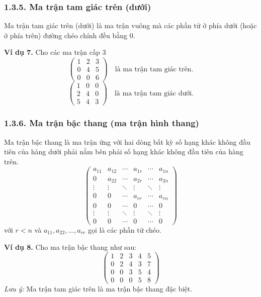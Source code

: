 \subsubsection*{1.3.5. Ma trận tam giác trên (dưới)}
Ma trận tam giác trên (dưới) là ma trận vuông mà các phần tử ở phía dưới (hoặc ở phía trên) đường chéo chính đều bằng 0.

\textbf{Ví dụ 7.} Cho các ma trận cấp 3
\[
\begin{pmatrix}
1 & 2 & 3 \\
0 & 4 & 5 \\
0 & 0 & 6
\end{pmatrix}
\quad \text{là ma trận tam giác trên.}
\]
\[
\begin{pmatrix}
1 & 0 & 0 \\
2 & 4 & 0 \\
5 & 4 & 3
\end{pmatrix}
\quad \text{là ma trận tam giác dưới.}
\]

\subsubsection*{1.3.6. Ma trận bậc thang (ma trận hình thang)}
Ma trận bậc thang là ma trận ứng với hai dòng bất kỳ số hạng khác không đầu tiên của hàng dưới phải nằm bên phải số hạng khác không đầu tiên của hàng trên.
\[
\begin{pmatrix}
a_{11} & a_{12} & \cdots & a_{1r} & \cdots & a_{1n} \\
0 & a_{22} & \cdots & a_{2r} & \cdots & a_{2n} \\
\vdots & \vdots & \ddots & \vdots & \ddots & \vdots \\
0 & 0 & \cdots & a_{rr} & \cdots & a_{rn} \\
0 & 0 & \cdots & 0 & \cdots & 0 \\
\vdots & \vdots & \ddots & \vdots & \ddots & \vdots \\
0 & 0 & \cdots & 0 & \cdots & 0
\end{pmatrix}
\]
với \( r < n \) và \( a_{11}, a_{22}, \ldots, a_{rr} \) gọi là các phần tử chéo.

\textbf{Ví dụ 8.} Cho ma trận bậc thang như sau:
\[
\begin{pmatrix}
1 & 2 & 3 & 4 & 5 \\
0 & 2 & 4 & 3 & 7 \\
0 & 0 & 3 & 5 & 4 \\
0 & 0 & 0 & 5 & 8
\end{pmatrix}
\]
\textit{Lưu ý:} Ma trận tam giác trên là ma trận bậc thang đặc biệt.

